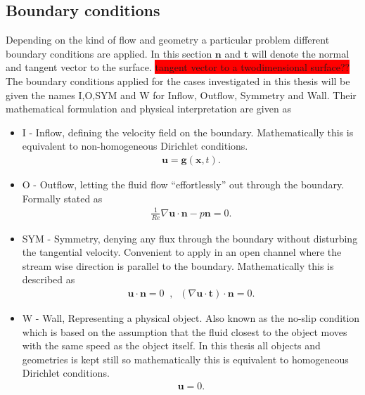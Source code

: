 \subsection{Boundary conditions}
Depending on the kind of flow and geometry a particular problem different boundary conditions are applied. In this section 
$\mathbf{n}$ and $\mathbf{t}$ will denote the normal and tangent vector to the surface.
\colorbox{red}{tangent vector to a twodimensional surface??}
The boundary conditions applied for the cases investigated in this thesis will be given the names 
I,O,SYM and W for Inflow, Outflow, Symmetry and Wall. Their mathematical formulation and physical interpretation are given as 
\begin{itemize}
    \item I 
        - Inflow, defining the velocity field on the boundary. Mathematically this is equivalent to 
        non-homogeneous Dirichlet conditions. 
        \begin{align}
            \mathbf{u} = \mathbf{g}(\mathbf{x},t).
        \end{align}
    \item O 
        - Outflow, letting the fluid flow ``effortlessly'' out through the boundary. Formally stated as
        \begin{align}
            \frac{1}{Re} \nabla\mathbf{u}\cdot \mathbf{n}-p\mathbf{n}= 0.
        \end{align}
    \item SYM 
        - Symmetry, denying any flux through the boundary without disturbing the tangential velocity. Convenient
        to apply in an open channel where the stream wise direction is parallel to the boundary. Mathematically this is 
        described as 
        \begin{align}
            \mathbf{u}\cdot \mathbf{n} = 0 \; \; , \; \; (\nabla\mathbf{u}\cdot \mathbf{t})\cdot \mathbf{n} = 0.
        \end{align}
    \item W 
        - Wall, Representing a physical object. Also known as the no-slip condition which is based on the assumption 
        that the fluid closest to the object moves with the same speed as the object itself. In this thesis all objects and 
        geometries is kept still so mathematically this is equivalent to 
        homogeneous Dirichlet conditions. 
        \begin{align}
            \mathbf{u} = 0.
        \end{align}

\end{itemize}
%
